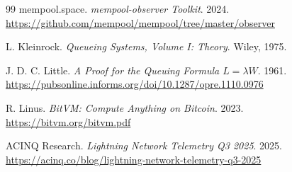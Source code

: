 \documentclass{article}
\theoremstyle{definition}
\begin{document}
\begin{thebibliography}{99}
 mempool.space.
\emph{mempool-observer Toolkit}. 2024. \url{https://github.com/mempool/mempool/tree/master/observer}

 L. Kleinrock.
\emph{Queueing Systems, Volume I: Theory}. Wiley, 1975.

 J. D. C. Little.
\emph{A Proof for the Queuing Formula $L=\lambda W$}.
1961. \url{https://pubsonline.informs.org/doi/10.1287/opre.1110.0976}

 R. Linus.
\emph{BitVM: Compute Anything on Bitcoin}. 2023. \url{https://bitvm.org/bitvm.pdf}

 ACINQ Research.
\emph{Lightning Network Telemetry Q3 2025}. 2025. \url{https://acinq.co/blog/lightning-network-telemetry-q3-2025}

\end{thebibliography}
\end{document}

